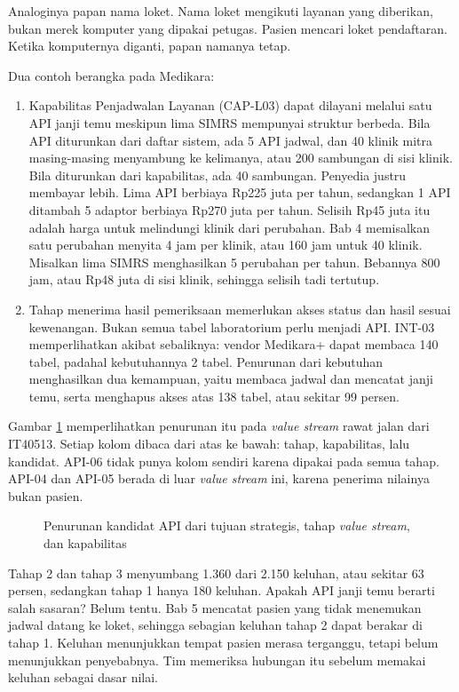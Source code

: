 Analoginya papan nama loket. Nama loket mengikuti layanan yang diberikan, bukan merek komputer yang dipakai petugas. Pasien
mencari loket pendaftaran. Ketika komputernya diganti, papan namanya tetap.

Dua contoh berangka pada Medikara:
\begin{enumerate}
  \item Kapabilitas Penjadwalan Layanan (CAP-L03) dapat dilayani melalui satu API janji temu meskipun lima SIMRS mempunyai
        struktur berbeda. Bila API diturunkan dari daftar sistem, ada 5 API jadwal, dan 40 klinik mitra masing-masing
        menyambung ke kelimanya, atau 200 sambungan di sisi klinik. Bila diturunkan dari kapabilitas, ada 40 sambungan.
        Penyedia justru membayar lebih. Lima API berbiaya Rp225 juta per tahun, sedangkan 1 API ditambah 5 adaptor berbiaya
        Rp270 juta per tahun. Selisih Rp45 juta itu adalah harga untuk melindungi klinik dari perubahan. Bab 4 memisalkan
        satu perubahan menyita 4 jam per klinik, atau 160 jam untuk 40 klinik. Misalkan lima SIMRS menghasilkan 5 perubahan
        per tahun. Bebannya 800 jam, atau Rp48 juta di sisi klinik, sehingga selisih tadi tertutup.
  \item Tahap menerima hasil pemeriksaan memerlukan akses status dan hasil sesuai kewenangan. Bukan semua tabel laboratorium
        perlu menjadi API. INT-03 memperlihatkan akibat sebaliknya: vendor Medikara+ dapat membaca 140 tabel, padahal
        kebutuhannya 2 tabel. Penurunan dari kebutuhan menghasilkan dua kemampuan, yaitu membaca jadwal dan mencatat janji
        temu, serta menghapus akses atas 138 tabel, atau sekitar 99 persen.
\end{enumerate}

Gambar \ref{fig:ch08-penurunan} memperlihatkan penurunan itu pada \textit{value stream} rawat jalan dari IT40513. Setiap
kolom dibaca dari atas ke bawah: tahap, kapabilitas, lalu kandidat. API-06 tidak punya kolom sendiri karena dipakai pada
semua tahap. API-04 dan API-05 berada di luar \textit{value stream} ini, karena penerima nilainya bukan pasien.

\begin{figure}[!htb]
  \centering
  
  \caption{Penurunan kandidat API dari tujuan strategis, tahap \textit{value stream}, dan kapabilitas}
  \label{fig:ch08-penurunan}
\end{figure}

Tahap 2 dan tahap 3 menyumbang 1.360 dari 2.150 keluhan, atau sekitar 63 persen, sedangkan tahap 1 hanya 180 keluhan.
Apakah API janji temu berarti salah sasaran? Belum tentu. Bab 5 mencatat pasien yang tidak menemukan jadwal datang ke loket,
sehingga sebagian keluhan tahap 2 dapat berakar di tahap 1. Keluhan menunjukkan tempat pasien merasa terganggu, tetapi belum
menunjukkan penyebabnya. Tim memeriksa hubungan itu sebelum memakai keluhan sebagai dasar nilai.

